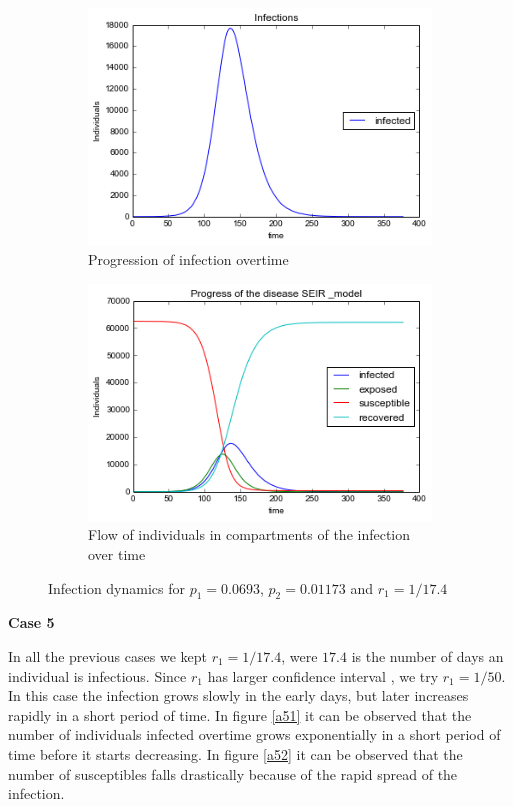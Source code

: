 \begin{figure}[h!]
    \centering
    \begin{subfigure}[b]{0.45\textwidth}
        \includegraphics[width=\textwidth]{images/4infections}
        \caption{Progression of infection overtime}
        \label{a41}
    \end{subfigure}
     \begin{subfigure}[b]{0.45\textwidth}
        \includegraphics[width=\textwidth]{images/4SEIR}
        \caption{  Flow of individuals in compartments of the infection over time}
        \label{a42}
    \end{subfigure}
  \caption{Infection dynamics for $p_1 = 0.0693 $, $p_2=0.01173$ and $r_1 = 1/17.4$ }
 \end{figure}
 \newpage
 \textbf{Case 5}
 
 In all the previous cases we kept $r_1 = 1/17.4$, were $17.4$ is the number of days an individual is infectious. Since  $r_1$ has larger confidence interval \citep{lessler2016times}, we try  $r_1 = 1/50$.  In this case the infection grows slowly in the early days, but later increases rapidly in a short period of time. In figure \ref{a51} it can be observed that the   number of individuals infected overtime grows exponentially in a short period of time before it starts decreasing. In figure \ref{a52} it can be observed that the number of susceptibles falls drastically because of the rapid spread of the infection.  

